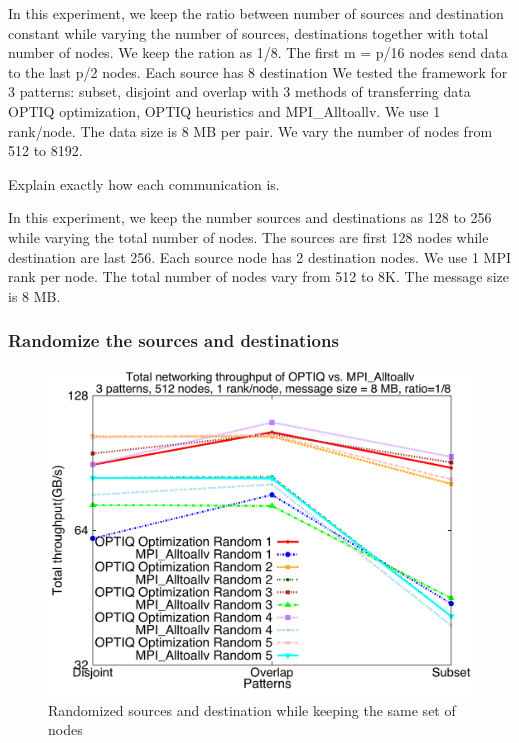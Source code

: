 In this experiment, we keep the ratio between number of sources and destination constant while varying the number of sources, destinations together with total number of nodes. We keep the ration as 1/8. The first m = p/16 nodes send data to the last p/2 nodes. Each source has 8 destination We tested the framework for 3 patterns: subset, disjoint and overlap with 3 methods of transferring data OPTIQ optimization, OPTIQ heuristics and MPI\_Alltoallv. We use 1 rank/node. The data size is 8 MB per pair. We vary the number of nodes from 512 to 8192.

Explain exactly how each communication is.

In this experiment, we keep the number sources and destinations as 128 to 256 while varying the total number of nodes. The sources are first 128 nodes while destination are last 256. Each source node has 2 destination nodes. We use 1 MPI rank per node. The total number of nodes vary from 512 to 8K. The message size is 8 MB.

\subsubsection{Randomize the sources and destinations}

\begin{figure}[!htb]
\vspace{-0.1in}
\centering
\includegraphics[scale=0.30]{figures/rand_opt_mpi.pdf}
\vspace{-0.1in}
\caption{Randomized sources and destination while keeping the same set of nodes}
\vspace{-0.1in}
\label{fig:random}
\end{figure}


